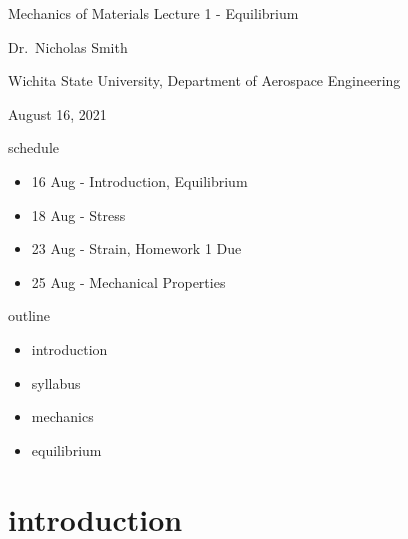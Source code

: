 \documentclass[12pt,handout]{beamer}
\providecommand{\tightlist}{%
  \setlength{\itemsep}{0pt}\setlength{\parskip}{0pt}}
\providecommand{\tightlist}{%
\setlength{\itemsep}{0pt}\setlength{\parskip}{0pt}}
\begin{document}
\begin{frame}{Mechanics of Materials}
\protect\hypertarget{mechanics-of-materials}{}
Lecture 1 - Equilibrium

Dr.~Nicholas Smith

Wichita State University, Department of Aerospace Engineering

August 16, 2021
\end{frame}

\begin{frame}{schedule}
\protect\hypertarget{schedule}{}
\begin{itemize}
\tightlist
\item
  16 Aug - Introduction, Equilibrium
\item
  18 Aug - Stress
\item
  23 Aug - Strain, Homework 1 Due
\item
  25 Aug - Mechanical Properties
\end{itemize}
\end{frame}

\begin{frame}{outline}
\protect\hypertarget{outline}{}
\begin{itemize}
\tightlist
\item
  introduction
\item
  syllabus
\item
  mechanics
\item
  equilibrium
\end{itemize}
\end{frame}

\hypertarget{introduction}{%
\section{introduction}\label{introduction}}
\end{document}
